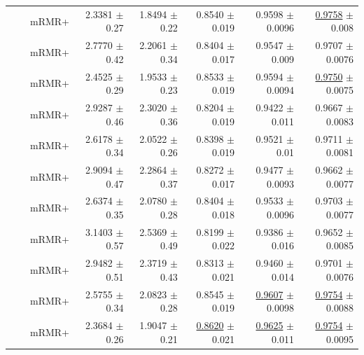 \begin{longtable}{llp{}rrrrr}
 &  & mRMR+ & 2.3381 {\scriptsize $\pm$ 0.27} & 1.8494 {\scriptsize $\pm$ 0.22} & 0.8540 {\scriptsize $\pm$ 0.019} & 0.9598 {\scriptsize $\pm$ 0.0096} & \underline{0.9758} {\scriptsize $\pm$ 0.008} \\
 &  & mRMR+ & 2.7770 {\scriptsize $\pm$ 0.42} & 2.2061 {\scriptsize $\pm$ 0.34} & 0.8404 {\scriptsize $\pm$ 0.017} & 0.9547 {\scriptsize $\pm$ 0.009} & 0.9707 {\scriptsize $\pm$ 0.0076} \\
 &  & mRMR+ & 2.4525 {\scriptsize $\pm$ 0.29} & 1.9533 {\scriptsize $\pm$ 0.23} & 0.8533 {\scriptsize $\pm$ 0.019} & 0.9594 {\scriptsize $\pm$ 0.0094} & \underline{0.9750} {\scriptsize $\pm$ 0.0075} \\
 &  & mRMR+ & 2.9287 {\scriptsize $\pm$ 0.46} & 2.3020 {\scriptsize $\pm$ 0.36} & 0.8204 {\scriptsize $\pm$ 0.019} & 0.9422 {\scriptsize $\pm$ 0.011} & 0.9667 {\scriptsize $\pm$ 0.0083} \\
 &  & mRMR+ & 2.6178 {\scriptsize $\pm$ 0.34} & 2.0522 {\scriptsize $\pm$ 0.26} & 0.8398 {\scriptsize $\pm$ 0.019} & 0.9521 {\scriptsize $\pm$ 0.01} & 0.9711 {\scriptsize $\pm$ 0.0081} \\
 &  & mRMR+ & 2.9094 {\scriptsize $\pm$ 0.47} & 2.2864 {\scriptsize $\pm$ 0.37} & 0.8272 {\scriptsize $\pm$ 0.017} & 0.9477 {\scriptsize $\pm$ 0.0093} & 0.9662 {\scriptsize $\pm$ 0.0077} \\
 &  & mRMR+ & 2.6374 {\scriptsize $\pm$ 0.35} & 2.0780 {\scriptsize $\pm$ 0.28} & 0.8404 {\scriptsize $\pm$ 0.018} & 0.9533 {\scriptsize $\pm$ 0.0096} & 0.9703 {\scriptsize $\pm$ 0.0077} \\
 &  & mRMR+ & 3.1403 {\scriptsize $\pm$ 0.57} & 2.5369 {\scriptsize $\pm$ 0.49} & 0.8199 {\scriptsize $\pm$ 0.022} & 0.9386 {\scriptsize $\pm$ 0.016} & 0.9652 {\scriptsize $\pm$ 0.0085} \\
 &  & mRMR+ & 2.9482 {\scriptsize $\pm$ 0.51} & 2.3719 {\scriptsize $\pm$ 0.43} & 0.8313 {\scriptsize $\pm$ 0.021} & 0.9460 {\scriptsize $\pm$ 0.014} & 0.9701 {\scriptsize $\pm$ 0.0076} \\
 &  & mRMR+ & 2.5755 {\scriptsize $\pm$ 0.34} & 2.0823 {\scriptsize $\pm$ 0.28} & 0.8545 {\scriptsize $\pm$ 0.019} & \underline{0.9607} {\scriptsize $\pm$ 0.0098} & \underline{0.9754} {\scriptsize $\pm$ 0.0088} \\
 &  & mRMR+ & 2.3684 {\scriptsize $\pm$ 0.26} & 1.9047 {\scriptsize $\pm$ 0.21} & \underline{0.8620} {\scriptsize $\pm$ 0.021} & \underline{0.9625} {\scriptsize $\pm$ 0.011} & \underline{0.9754} {\scriptsize $\pm$ 0.0095} \\

\end{longtable}
